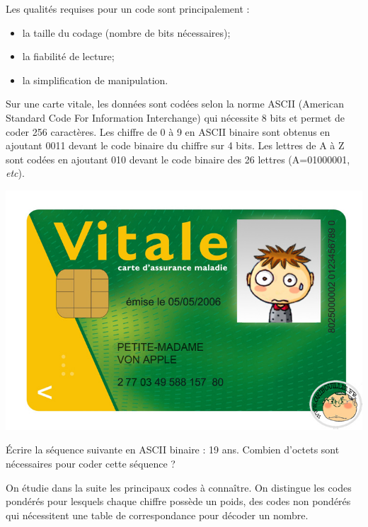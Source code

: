 \documentclass[11pt,oneside]{article}
\begin{document}
Les qualités requises pour un code sont principalement :
\begin{itemize}
\item la taille du codage (nombre de bits nécessaires);
\item la fiabilité de lecture;
\item la simplification de manipulation.
\end{itemize}

\begin{exemple}
\begin{minipage}[c]{.7\linewidth}
Sur une carte vitale, les données sont codées selon la norme ASCII (American Standard Code For Information Interchange) qui nécessite 8 bits et permet de coder 256 caractères. Les chiffre de 0 à 9 en ASCII binaire sont obtenus en ajoutant 0011 devant le code binaire du chiffre sur 4 bits. Les lettres de A à Z sont codées en ajoutant 010 devant le code binaire des 26 lettres (A=01000001, \textit{etc}).
\end{minipage}\hfill
\begin{minipage}[c]{.25\linewidth}
\begin{center}
\includegraphics[width=.8\textwidth]{png/fig_02}
\end{center}
\end{minipage}
\end{exemple}

\begin{exemple}
Écrire la séquence suivante en ASCII binaire : 19 ans. Combien d'octets sont nécessaires pour coder cette séquence ?

\end{exemple}

On étudie dans la suite les principaux codes à connaître. On distingue les codes pondérés pour lesquels chaque chiffre possède un poids, des codes non pondérés qui nécessitent une table de correspondance pour décoder un nombre. 
\end{document}
